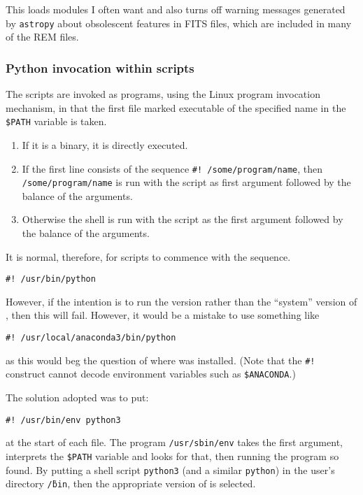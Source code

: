 This loads modules I often want and also turns off warning messages generated
by \texttt{astropy} about obsolescent features in FITS files, which are
included in many of the REM files.

\subsubsection{Python invocation within scripts}
\protect\label{section:pyinvocation}

The {\py} scripts are invoked as programs, using the Linux program invocation
mechanism, in that the first file marked executable of the specified name in the
\texttt{\$PATH} variable is taken.

\begin{enumerate}
  \item If it is a binary, it is directly executed.
  \item If the first line consists of the sequence
  \texttt{\#!~/some/program/name}, then \texttt{/some/program/name} is run with
  the script as first argument followed by the balance of the arguments.
  \item Otherwise the shell is run with the script as the first argument
  followed by the balance of the arguments.
\end{enumerate}

It is normal, therefore, for {\py} scripts to commence with the sequence.

\begin{verbatim}
#! /usr/bin/python
\end{verbatim}

However, if the intention is to run the {\anac} version rather than the
``system'' version of \py, then this will fail. However, it would be a mistake
to use something like

\begin{verbatim}
#! /usr/local/anaconda3/bin/python
\end{verbatim}

as this would beg the question of where {\anac} was installed. (Note that the
\texttt{\#!} construct cannot decode environment variables such as
\texttt{\$ANACONDA}.)

The solution adopted was to put:

\begin{verbatim}
#! /usr/bin/env python3
\end{verbatim}

at the start of each file. The program \texttt{/usr/sbin/env} takes the first
argument, interprets the \texttt{\$PATH} variable and looks for that, then
running the program so found. By putting a shell script \texttt{python3} (and
a similar \texttt{python}) in the user's directory \texttt{\~/bin}, then the
appropriate version of {\py} is selected.

